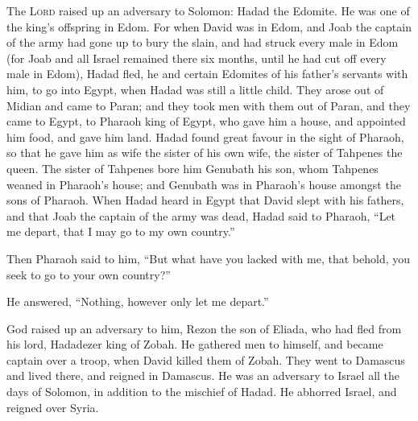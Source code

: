  The \textsc{Lord} raised up an adversary to Solomon:
Hadad the Edomite. He was one of the king's offspring in Edom.
 For when David was in Edom, and Joab the captain of the
army had gone up to bury the slain, and had struck every male in Edom
 (for Joab and all Israel remained there six months,
until he had cut off every male in Edom),  Hadad fled, he
and certain Edomites of his father's servants with him, to go into
Egypt, when Hadad was still a little child.  They arose
out of Midian and came to Paran; and they took men with them out of
Paran, and they came to Egypt, to Pharaoh king of Egypt, who gave him a
house, and appointed him food, and gave him land.  Hadad
found great favour in the sight of Pharaoh, so that he gave him as wife
the sister of his own wife, the sister of Tahpenes the queen.
 The sister of Tahpenes bore him Genubath his son, whom
Tahpenes weaned in Pharaoh's house; and Genubath was in Pharaoh's house
amongst the sons of Pharaoh.  When Hadad heard in Egypt
that David slept with his fathers, and that Joab the captain of the army
was dead, Hadad said to Pharaoh, ``Let me depart, that I may go to my
own country.''

 Then Pharaoh said to him, ``But what have you lacked
with me, that behold, you seek to go to your own country?''

He answered, ``Nothing, however only let me depart.''

 God raised up an adversary to him, Rezon the son of
Eliada, who had fled from his lord, Hadadezer king of Zobah.
 He gathered men to himself, and became captain over a
troop, when David killed them of Zobah. They went to Damascus and lived
there, and reigned in Damascus.  He was an adversary to
Israel all the days of Solomon, in addition to the mischief of Hadad. He
abhorred Israel, and reigned over Syria.

